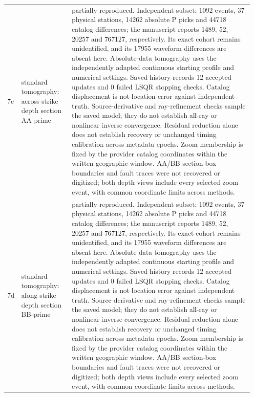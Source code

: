\begin{longtable}{>{\raggedright\arraybackslash}p{}>{\raggedright\arraybackslash}p{}>{\raggedright\arraybackslash}p{}}
7c & standard tomography: across-strike depth section AA-prime & partially reproduced. Independent subset: 1092 events, 37 physical stations, 14262 absolute P picks and 44718 catalog differences; the manuscript reports 1489, 52, 20257 and 767127, respectively. Its exact cohort remains unidentified, and its 17955 waveform differences are absent here. Absolute-data tomography uses the independently adapted continuous starting profile and numerical settings. Saved history records 12 accepted updates and 0 failed LSQR stopping checks. Catalog displacement is not location error against independent truth. Source-derivative and ray-refinement checks sample the saved model; they do not establish all-ray or nonlinear inverse convergence. Residual reduction alone does not establish recovery or unchanged timing calibration across metadata epochs. Zoom membership is fixed by the provider catalog coordinates within the written geographic window. AA/BB section-box boundaries and fault traces were not recovered or digitized; both depth views include every selected zoom event, with common coordinate limits across methods.\\
7d & standard tomography: along-strike depth section BB-prime & partially reproduced. Independent subset: 1092 events, 37 physical stations, 14262 absolute P picks and 44718 catalog differences; the manuscript reports 1489, 52, 20257 and 767127, respectively. Its exact cohort remains unidentified, and its 17955 waveform differences are absent here. Absolute-data tomography uses the independently adapted continuous starting profile and numerical settings. Saved history records 12 accepted updates and 0 failed LSQR stopping checks. Catalog displacement is not location error against independent truth. Source-derivative and ray-refinement checks sample the saved model; they do not establish all-ray or nonlinear inverse convergence. Residual reduction alone does not establish recovery or unchanged timing calibration across metadata epochs. Zoom membership is fixed by the provider catalog coordinates within the written geographic window. AA/BB section-box boundaries and fault traces were not recovered or digitized; both depth views include every selected zoom event, with common coordinate limits across methods.\\

\end{longtable}
